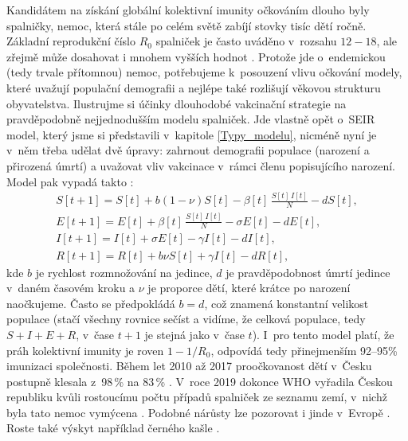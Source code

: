 Kandidátem na získání globální kolektivní imunity očkováním dlouho byly spalničky, nemoc, která stále po celém světě zabíjí stovky tisíc dětí ročně. Základní reprodukční číslo $R_0$ spalniček je často uváděno v~rozsahu $12-18$, ale zřejmě může dosahovat i mnohem vyšších hodnot \cite{Guerra_etal2017}. Protože jde o~endemickou (tedy trvale přítomnou) nemoc, potřebujeme k~posouzení vlivu očkování modely, které uvažují populační demografii a nejlépe také rozlišují věkovou strukturu obyvatelstva. Ilustrujme si účinky dlouhodobé vakcinační strategie na pravděpodobně nejjednodušším modelu spalniček. Jde vlastně opět o~SEIR model, který jsme si představili v~kapitole \ref{Typy_modelu}, nicméně nyní je v~něm třeba udělat dvě úpravy: zahrnout demografii populace (narození a přirozená úmrtí) a uvažovat vliv vakcinace v~rámci členu popisujícího narození. Model pak vypadá takto \cite{BolkerGrenfell1993}:
\begin{equation}
	\begin{array}{l}
		\displaystyle{S[t+1] = S[t] + b (1-\nu) S[t] - \beta[t] \, \frac{S[t]\,I[t]}{N} - d S[t]}, \\[3ex]
		\displaystyle{E[t+1] = E[t] + \beta[t] \, \frac{S[t]\,I[t]}{N} - \sigma E[t] - d E[t]}, \\[3ex]
		\displaystyle{I[t+1] = I[t] + \sigma E[t] - \gamma I[t] - d I[t]}, \\[3ex]
		\displaystyle{R[t+1] = R[t] + b \nu S[t] + \gamma I[t] - d R[t]},
	\end{array}
	\label{measles-model1}
\end{equation}
kde $b$ je rychlost rozmnožování na jedince, $d$ je pravděpodobnost úmrtí jedince v~daném časovém kroku a $\nu$ je proporce dětí, které krátce po narození naočkujeme. Často se předpokládá $b=d$, což znamená konstantní velikost populace (stačí všechny rovnice sečíst a vidíme, že celková populace, tedy $S+I+E+R$, v~čase $t+1$ je stejná jako v~čase $t$). I~pro tento model platí, že práh kolektivní imunity je roven $1-1/R_0$, odpovídá tedy přinejmenším 92--95\% imunizaci společnosti. Během let 2010 až 2017 proočkovanost dětí v~Česku postupně klesala z~98\,\% na 83\,\% \cite{spavac}. V~roce 2019 dokonce WHO vyřadila Českou republiku kvůli rostoucímu počtu případů spalniček ze seznamu zemí, v~nichž byla tato nemoc vymýcena \cite{spaend}. Podobné nárůsty lze pozorovat i jinde v~Evropě \cite{Thornton2019}. Roste také výskyt například černého kašle \cite{Lavine_etal2011}. 

